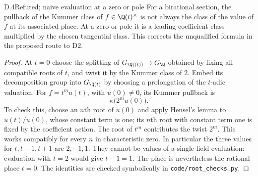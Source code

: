 \begin{claim}{D.4}{Refuted; naive evaluation at a zero or pole}
For a birational section, the pullback of the Kummer class of
$f\in\Q(t)^\times$ is not always the class of the value of $f$ at
its associated place. At a zero or pole it is a leading-coefficient
class multiplied by the chosen tangential class. This corrects the
unqualified formula in the proposed route to D2.
\end{claim}
\begin{proof}
At $t=0$ choose the splitting of
$G_{\Q((t))}\to G_\Q$ obtained by fixing all compatible roots of
$t$, and twist it by the Kummer class of $2$. Embed its decomposition
group into $G_{\Q(t)}$ by choosing a prolongation of the $t$-adic
valuation. For $f=t^m u(t)$, with $u(0)\ne0$, its Kummer pullback is
\[
                         \kappa\bigl(2^m u(0)\bigr).
\]
To check this, choose an $n$th root of $u(0)$ and apply Hensel's
lemma to $u(t)/u(0)$, whose constant term is one; its $n$th root
with constant term one is fixed by the coefficient action. The
root of $t^m$ contributes the twist $2^m$. This works compatibly
for every $n$ in characteristic zero. In particular the three
values for $t,t-1,t+1$ are $2,-1,1$. They cannot be values of a
single field evaluation: evaluation with $t=2$ would give $t-1=1$.
The place is nevertheless the rational place $t=0$. The identities
are checked symbolically in \texttt{code/root\_checks.py}.
\end{proof}

